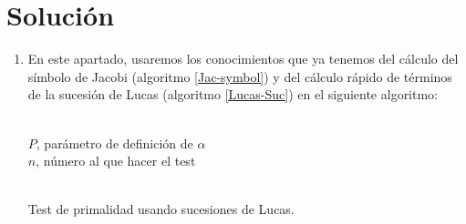 \section*{Solución}
	\begin{enumerate}
		\item En este apartado, usaremos los conocimientos que ya tenemos del cálculo del símbolo de Jacobi (algoritmo
		\ref{Jac-symbol}) y del cálculo rápido de términos de la sucesión de Lucas (algoritmo \ref{Lucas-Suc}) en el
		siguiente algoritmo:
		
		\begin{algorithm}[H]
		\begin{algorithmic}[1]
			\REQUIRE \ \\
				\texttt{$P$}, parámetro de definición de $\alpha$ \\
				\texttt{$n$}, número al que hacer el test \\ \
				\ELSE
						\ENDIF
					\ENDFOR
				\ENDIF
					\ENDFOR
				\ELSE
				\ENDIF
			\ENDWHILE
			\ENDIF
		\end{algorithmic}
		\caption{Test de primalidad usando sucesiones de Lucas.}
		\label{Primarity}
		\end{algorithm}
		

\end{enumerate}
